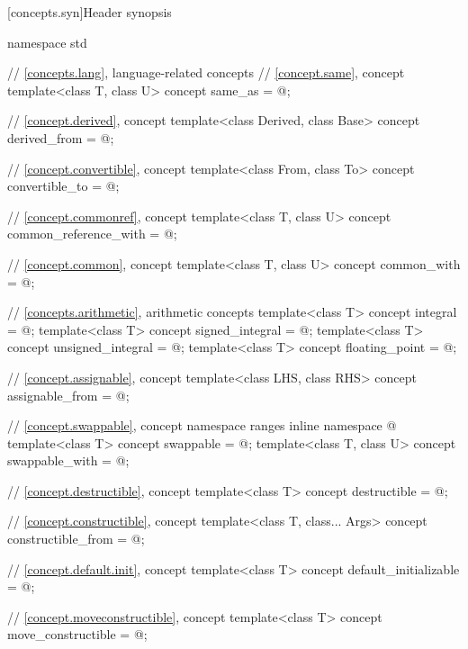 [concepts.syn]{Header  synopsis}

%
\begin{codeblock}
namespace std {
  // \ref{concepts.lang}, language-related concepts
  // \ref{concept.same}, concept 
  template<class T, class U>
    concept same_as = @\seebelow@;

  // \ref{concept.derived}, concept 
  template<class Derived, class Base>
    concept derived_from = @\seebelow@;

  // \ref{concept.convertible}, concept 
  template<class From, class To>
    concept convertible_to = @\seebelow@;

  // \ref{concept.commonref}, concept 
  template<class T, class U>
    concept common_reference_with = @\seebelow@;

  // \ref{concept.common}, concept 
  template<class T, class U>
    concept common_with = @\seebelow@;

  // \ref{concepts.arithmetic}, arithmetic concepts
  template<class T>
    concept integral = @\seebelow@;
  template<class T>
    concept signed_integral = @\seebelow@;
  template<class T>
    concept unsigned_integral = @\seebelow@;
  template<class T>
    concept floating_point = @\seebelow@;

  // \ref{concept.assignable}, concept 
  template<class LHS, class RHS>
    concept assignable_from = @\seebelow@;

  // \ref{concept.swappable}, concept 
  namespace ranges {
    inline namespace @
  }
  template<class T>
    concept swappable = @\seebelow@;
  template<class T, class U>
    concept swappable_with = @\seebelow@;

  // \ref{concept.destructible}, concept 
  template<class T>
    concept destructible = @\seebelow@;

  // \ref{concept.constructible}, concept 
  template<class T, class... Args>
    concept constructible_from = @\seebelow@;

  // \ref{concept.default.init}, concept 
  template<class T>
    concept default_initializable = @\seebelow@;

  // \ref{concept.moveconstructible}, concept 
  template<class T>
    concept move_constructible = @\seebelow@;

}
\end{codeblock}
